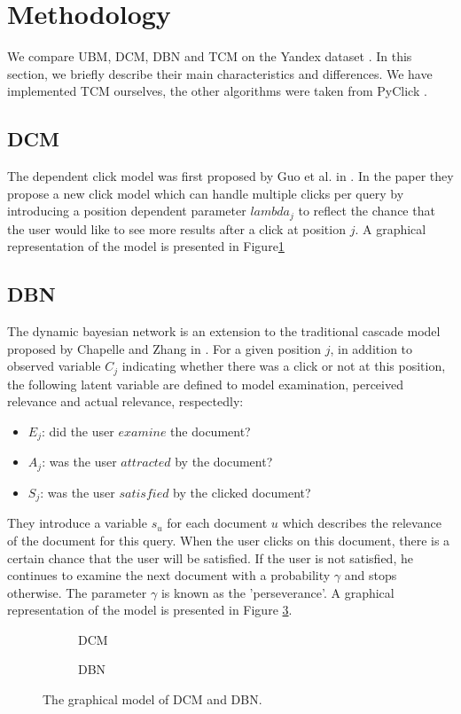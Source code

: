 \section{Methodology}
\label{sec:methodology}
We compare UBM, DCM, DBN and TCM on the Yandex dataset \cite{yandex}. In this section, we briefly describe their main characteristics and differences. We have implemented TCM ourselves, the other algorithms were taken from PyClick \cite{PyClick}.

\subsection{DCM}
The dependent click model was first proposed by Guo et al. in \cite{Guo2009}. In the paper they propose a new click model which can handle multiple clicks per query by introducing a position dependent parameter $lambda_j$ to reflect the chance that the user would like to see more results after a click at position $j$. A graphical representation of the model is presented in Figure\ref{fig:dcm_gm} 

\subsection{DBN}
The dynamic bayesian network is an extension to the traditional cascade model proposed by Chapelle and Zhang in \cite{Zhang2011}. For a given position $j$, in addition to observed variable $C_j$ indicating whether there was a click or not at this position, the following latent variable are defined to model examination, perceived relevance and actual relevance, respectedly:
\begin{itemize}
	\item $E_j$: did the user $examine$ the document?
	\item $A_j$: was the user $attracted$ by the document?
	\item $S_j$: was the user $satisfied$ by the clicked document?
\end{itemize}
They introduce a variable $s_u$ for each document $u$ which describes the relevance of the document for this query. When the user clicks on this document, there is a certain chance that the user will be satisfied. If the user is not satisfied, he continues to examine the next document with a probability $\gamma$ and stops otherwise. The parameter $\gamma$ is known as the 'perseverance'. A graphical representation of the model is presented in Figure \ref{fig:dbn_gm}. 

\begin{figure}[ht!]
	\begin{subfigure}[b]{.45\textwidth}
		\centering
		
		\caption{DCM}	
		\label{fig:dcm_gm}
	\end{subfigure}
	\begin{subfigure}[b]{.45\textwidth}
		\centering
		
		\caption{DBN}
		\label{fig:dbn_gm}
	\end{subfigure}
	\caption{The graphical model of DCM and DBN.}
\end{figure}

